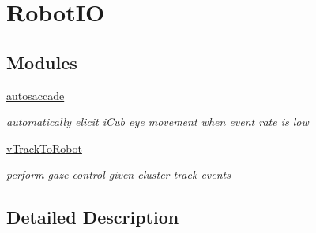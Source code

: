 \hypertarget{group__RobotIO}{}\section{Robot\+IO}
\label{group__RobotIO}
\subsection*{Modules}
\begin{DoxyCompactItemize}
\item 
\hyperlink{group__autosaccade}{autosaccade}
\begin{DoxyCompactList}\small\item\em automatically elicit i\+Cub eye movement when event rate is low \end{DoxyCompactList}\item 
\hyperlink{group__vTrackToRobot}{v\+Track\+To\+Robot}
\begin{DoxyCompactList}\small\item\em perform gaze control given cluster track events \end{DoxyCompactList}\end{DoxyCompactItemize}


\subsection{Detailed Description}
